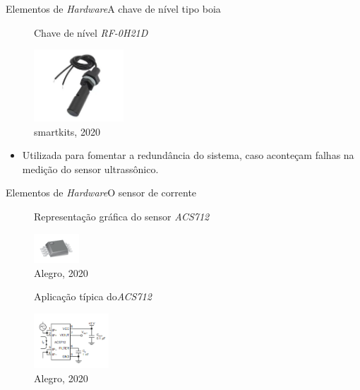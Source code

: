 \begin{frame}{Elementos de \textit{Hardware}}{A chave de nível tipo boia}
    \begin{figure}[H]
        \centering
        \caption{Chave de nível \textit{RF-0H21D}}
        \includegraphics[width=0.3\textwidth]{figuras/chave_boia.png}
        \caption*{\tiny{smartkits, 2020}}
        \label{fig:chaveboia}
    \end{figure}

    \begin{itemize}
        \item Utilizada para fomentar a redundância do sistema, caso aconteçam falhas na medição do sensor ultrassônico.
    \end{itemize}    
  
\end{frame}

\begin{frame}{Elementos de \textit{Hardware}}{O sensor de corrente}
    \begin{figure}[H]
        \centering
        \caption{Representação gráfica do sensor \textit{ACS712}}
        \includegraphics[width=0.15\textwidth]{figuras/ACS712.png}
        \caption*{\tiny{Alegro, 2020}}
        \label{fig:acs712}
    \end{figure}

    \begin{figure}[H]
        \centering
        \caption{Aplicação típica do\textit{ACS712}}
        \hspace*{0.1cm}
        \includegraphics[width=0.25\textwidth]{figuras/ACS712_typical.png}
        \caption*{\tiny{Alegro, 2020}}
        \label{fig:acs712_typical}
    \end{figure}

\end{frame}

